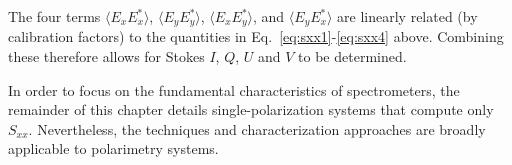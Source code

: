 \documentclass{ws-rv961x669}
\begin{document}
The four terms $\langle E_x E_x^*\rangle$, $\langle E_y E_y^* \rangle$, $\langle E_x E_y^* \rangle$, and $\langle E_y E_x^* \rangle$ are linearly related (by calibration factors) to the quantities in Eq.~\ref{eq:sxx1}-\ref{eq:sxx4} above. Combining these therefore allows for Stokes $I$, $Q$, $U$ and $V$ to be determined.

In order to focus on the fundamental characteristics of spectrometers, the remainder of this chapter details single-polarization systems that compute only $S_{xx}$. Nevertheless, the techniques and characterization approaches are broadly applicable to polarimetry systems.




\end{document}
